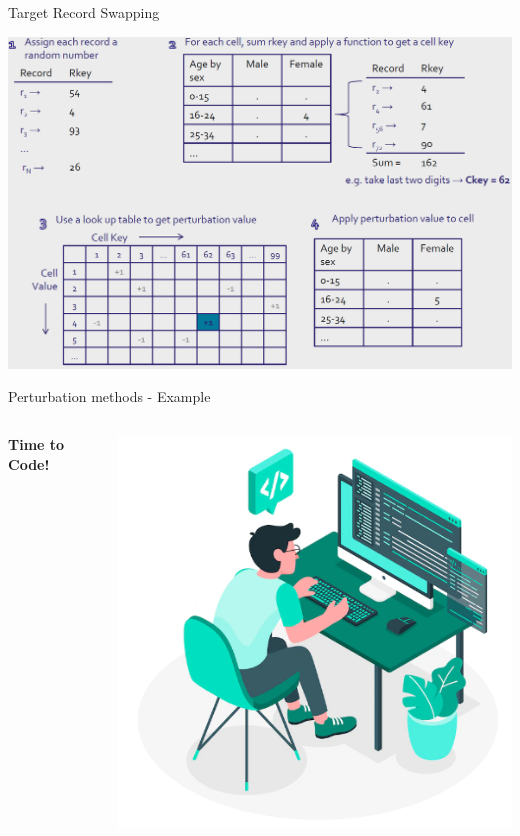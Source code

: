 \documentclass[
	aspectratio = 169
 ]{beamer}
\begin{document}
\begin{frame}{Target Record Swapping}

\centering
\includegraphics[width=0.8\linewidth]{Presentation TEX//gallery/cell-key.png}

\end{frame}
\begin{frame}{Perturbation methods - Example}

\begin{columns}
    \centering
    \Huge
    \textbf{Time to Code!}

    \centering
    \includegraphics[width=\linewidth]{Presentation TEX//gallery/coding.png}
\end{columns}

\end{frame}
\end{document}
